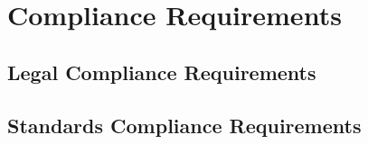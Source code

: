 \section{Compliance Requirements}
\subsection{Legal Compliance Requirements}
\subsection{Standards Compliance Requirements}